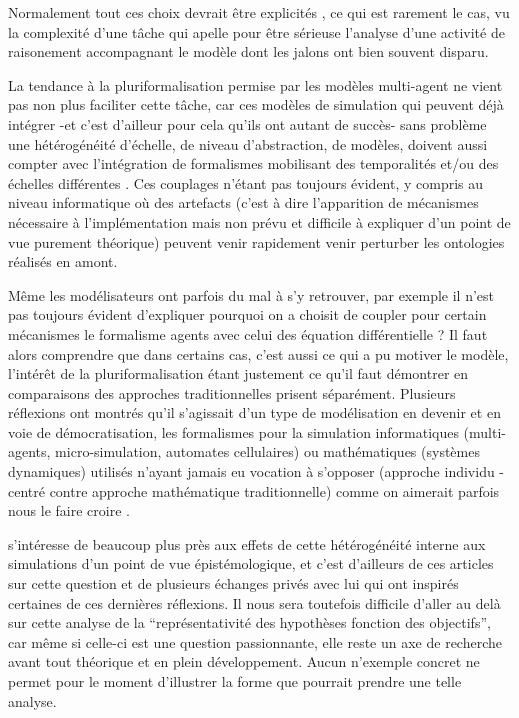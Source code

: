 Normalement tout ces choix devrait être explicités \autocite{Varenne2013b}, ce qui est rarement le cas, vu la complexité d'une tâche qui apelle pour être sérieuse l'analyse d'une activité de raisonement accompagnant le modèle dont les jalons ont bien souvent disparu.

La tendance à la pluriformalisation  permise par les modèles multi-agent ne vient pas non plus faciliter cette tâche, car ces modèles de simulation qui peuvent déjà intégrer -et c'est d'ailleur pour cela qu'ils ont autant de succès- sans problème une hétérogénéité d'échelle, de niveau d'abstraction, de modèles, doivent aussi compter avec l'intégration de formalismes mobilisant des temporalités et/ou des échelles différentes \autocites{Varenne2008,Varenne2012a}. Ces couplages n'étant pas toujours évident, y compris au niveau informatique où des artefacts (c'est à dire l'apparition de mécanismes nécessaire à l'implémentation mais non prévu et difficile à expliquer d'un point de vue purement théorique) peuvent venir rapidement venir perturber les ontologies réalisés en amont. 

Même les modélisateurs ont parfois du mal à s'y retrouver, par exemple il n'est pas toujours évident d'expliquer pourquoi on a choisit de coupler pour certain mécanismes le formalisme agents avec celui des équation différentielle ? Il faut alors comprendre que dans certains cas, c'est aussi ce qui a pu motiver le modèle, l'intérêt de la pluriformalisation étant justement ce qu'il faut démontrer en comparaisons des approches traditionnelles prisent séparément. Plusieurs réflexions ont montrés qu'il s'agissait d'un type de modélisation en devenir et en voie de démocratisation, les formalismes pour la simulation informatiques (multi-agents, micro-simulation, automates cellulaires) ou mathématiques (systèmes dynamiques) utilisés n'ayant jamais eu vocation à s'opposer (approche individu - centré contre approche mathématique traditionnelle) comme on aimerait parfois nous le faire croire \autocites{Sanders2013, Banos2013}. 

\textcite{Varenne2013b} s’intéresse de beaucoup plus près aux effets de cette hétérogénéité interne aux simulations d’un point de vue épistémologique, et c’est d'ailleurs de ces articles sur cette question et de plusieurs échanges privés avec lui qui ont inspirés certaines de ces dernières réflexions. Il nous sera toutefois difficile d’aller au delà sur cette analyse de la \enquote{représentativité des hypothèses fonction des objectifs}, car même si celle-ci est une question passionnante, elle reste un axe de recherche avant tout théorique et en plein développement. Aucun n'exemple concret ne permet pour le moment d'illustrer la forme que pourrait prendre une telle analyse.

